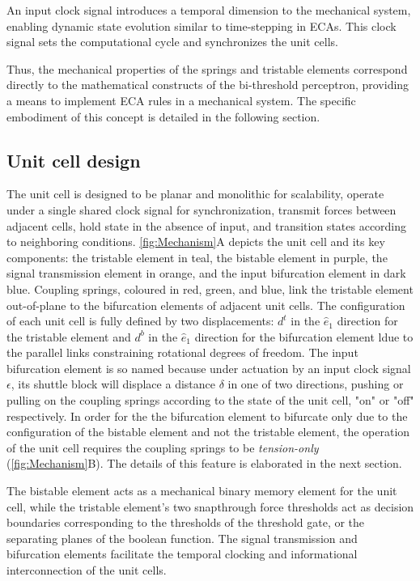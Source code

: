 An input clock signal introduces a temporal dimension to the mechanical system, enabling dynamic state evolution similar to time-stepping in ECAs. This clock signal sets the computational cycle and synchronizes the unit cells.

Thus, the mechanical properties of the springs and tristable elements correspond directly to the mathematical constructs of the bi-threshold perceptron, providing a means to implement ECA rules in a mechanical system. The specific embodiment of this concept is detailed in the following section.

\subsection*{Unit cell design}
The unit cell is designed to be planar and monolithic for scalability, operate under a single shared clock signal for synchronization, transmit forces between adjacent cells, hold state in the absence of input, and transition states according to neighboring conditions. \autoref*{fig:Mechanism}A depicts the unit cell and its key components: the tristable element in teal, the bistable element in purple, the signal transmission element in orange, and the input bifurcation element in dark blue. Coupling springs, coloured in red, green, and blue, link the tristable element out-of-plane to the bifurcation elements of adjacent unit cells. The configuration of each unit cell is fully defined by two displacements: \(d^t\) in the \(\hat{e}_1\) direction for the tristable element and \(d^b\) in the \(\hat{e}_1\) direction for the bifurcation element ldue to the parallel links constraining rotational degrees of freedom. The input bifurcation element is so named because under actuation by an input clock signal \(\epsilon\), its shuttle block will displace a distance \(\delta\) in one of two directions, pushing or pulling on the coupling springs according to the state of the unit cell, "on" or "off" respectively. In order for the the bifurcation element to bifurcate only due to the configuration of the bistable element and not the tristable element, the operation of the unit cell requires the coupling springs to be \emph{tension-only} (\autoref*{fig:Mechanism}B). The details of this feature is elaborated in the next section. 

The bistable element acts as a mechanical binary memory element for the unit cell, while the tristable element's two snapthrough force thresholds act as decision boundaries corresponding to the thresholds of the threshold gate, or the separating planes of the boolean function. The signal transmission and bifurcation elements facilitate the temporal clocking and informational interconnection of the unit cells. 

